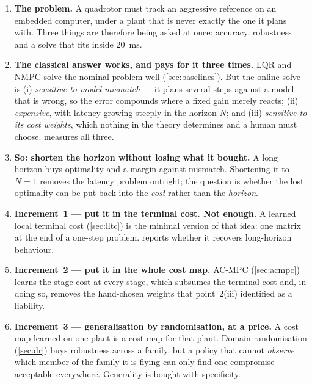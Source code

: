\documentclass[11pt,a4paper,twoside,openright]{report}
\theoremstyle{plain}
\theoremstyle{definition}
\theoremstyle{remark}
\begin{document}
	\begin{enumerate}[leftmargin=*]
		\item \textbf{The problem.} A quadrotor must track an aggressive reference on
		an embedded computer, under a plant that is never exactly the one it plans
		with. Three things are therefore being asked at once: accuracy, robustness and
		a solve that fits inside \SI{20}{\milli\second}.

		\item \textbf{The classical answer works, and pays for it three times.}
		LQR and NMPC solve the nominal problem well (\cref{sec:baselines}). But the
		online solve is (i) \emph{sensitive to model mismatch} --- it plans several
		steps against a model that is wrong, so the error compounds where a fixed gain
		merely reacts; (ii) \emph{expensive}, with latency growing steeply in the
		horizon $N$; and (iii) \emph{sensitive to its cost weights}, which nothing in
		the theory determines and a human must choose. 
		measures all three.

		\item \textbf{So: shorten the horizon without losing what it bought.} A
		long horizon buys optimality and a margin against mismatch. Shortening it to
		$N{=}1$ removes the latency problem outright; the question is whether the
		lost optimality can be put back into the \emph{cost} rather than the
		\emph{horizon}.

		\item \textbf{Increment~1 --- put it in the terminal cost. Not enough.}
		A learned local terminal cost (\cref{sec:lltc}) is the minimal version of that
		idea: one matrix at the end of a one-step problem.  reports
		whether it recovers long-horizon behaviour.

		\item \textbf{Increment~2 --- put it in the whole cost map.} AC-MPC
		(\cref{sec:acmpc}) learns the stage cost at every stage, which subsumes the
		terminal cost and, in doing so, removes the hand-chosen weights that
		point~2(iii) identified as a liability.

		\item \textbf{Increment~3 --- generalisation by randomisation, at a price.}
		A cost map learned on one plant is a cost map for that plant. Domain
		randomisation (\cref{sec:dr}) buys robustness across a family, but a policy
		that cannot \emph{observe} which member of the family it is flying can only
		find one compromise acceptable everywhere. Generality is bought with
		specificity.


\end{enumerate}
\end{document}
